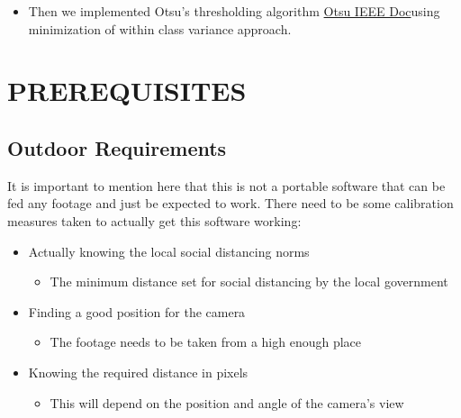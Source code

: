 \documentclass[a4paper]{article}
\begin{document}
\begin{itemize}
    \pagebreak

    \item Then we implemented Otsu's thresholding algorithm \textcolor{green}{\href{https://cw.fel.cvut.cz/wiki/_media/courses/a6m33bio/otsu.pdf}{Otsu IEEE Doc}}using minimization of within class variance approach. 

    
    
\end{itemize}

\pagebreak

\section{PREREQUISITES}

\subsection{Outdoor Requirements}
It is important to mention here that this is not a portable software that can
be fed any footage and just be expected to work. There need to be some
calibration measures taken to actually get this software working:

\begin{itemize}
    \item Actually knowing the local social distancing norms
          \begin{itemize}
              \item The minimum distance set for social distancing by the local government
          \end{itemize}

    \item Finding a good position for the camera
          \begin{itemize}
              \item The footage needs to be taken from a high enough place
          \end{itemize}

    \item Knowing the required distance in pixels
          \begin{itemize}
              \item This will depend on the position and angle of the camera's view
          \end{itemize}
\end{itemize}
\end{document}
